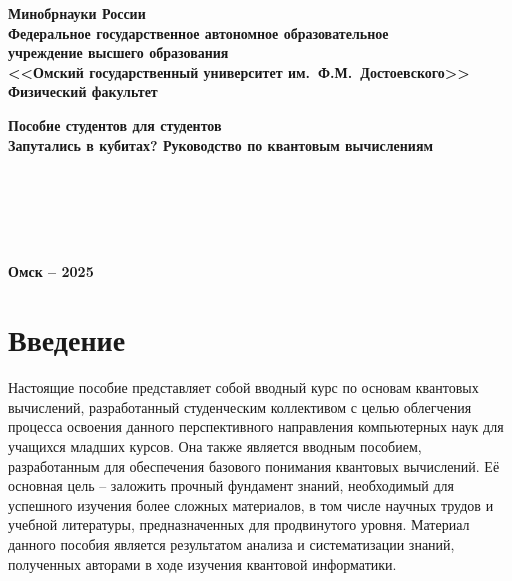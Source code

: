 \documentclass[12pt,a4paper]{article}
\begin{document}
	\begin{titlepage}
		\begin{center}
			{\large\bf {Минобрнауки России}\\[12pt]
				Федеральное государственное автономное образовательное \\
				учреждение высшего образования \\
				<<Омский государственный университет им.~Ф.М.~Достоевского>>\\[12pt]
				Физический факультет\\[12pt]
			}
			
			{\large\bf Пособие студентов для студентов }\\[12pt]
			{\Large\bf Запутались в кубитах? Руководство по квантовым вычислениям }\\[2cm]
		\end{center}
		\vfill
		\hspace*{7cm}{\bf Составители:}\\[12pt]
		\hspace*{8cm}{\bf  Cтудент  Журавлева Анастасия }\\[12pt]
		\hspace*{8cm}{\bf  Cтудент Коцур Павел }\\[12pt]
		\hspace*{8cm}{\bf  Cтудент  Бахтин Артур}\\[1.5cm]	
		
		\begin{center}
			{\bf Омск -- 2025}
		\end{center}
	\end{titlepage}
	
	\addtocounter{page}{1}
	
	\tableofcontents
	\newpage
	
	\section*{Введение}	
	Настоящие пособие представляет собой вводный курс по основам квантовых вычислений, разработанный студенческим коллективом с целью облегчения процесса освоения данного перспективного направления компьютерных наук для учащихся младших курсов. Она также является вводным пособием, разработанным для обеспечения базового понимания квантовых вычислений. Её основная цель – заложить прочный фундамент знаний, необходимый для успешного изучения более сложных материалов, в том числе научных трудов и учебной литературы, предназначенных для продвинутого уровня. Материал данного пособия является результатом анализа и систематизации знаний, полученных авторами в ходе изучения квантовой информатики.\\
	
\end{document}
